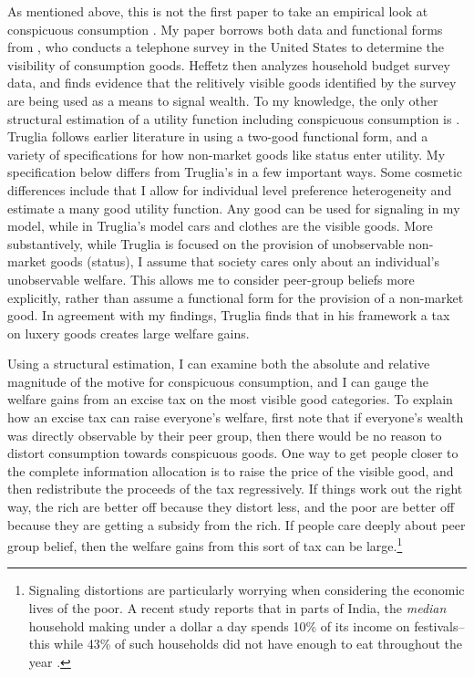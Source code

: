 \documentclass[12pt]{article}
\begin{document}
As mentioned above, this is not the first paper to take an empirical look at conspicuous consumption  \citep{Blochetal2004,Charlesetal2009,MoavNeeman2010,MoavNeeman2012}.  My paper borrows both data and functional forms from \citet{Heffetz2011}, who conducts a telephone survey in the United States to determine the visibility of consumption goods.  Heffetz then analyzes household budget survey data, and finds evidence that the relitively visible goods identified by the survey are being used as a means to signal wealth.  To my knowledge, the only other structural estimation of a utility function including conspicuous consumption is \citet{Truglia2012}.  Truglia follows earlier literature in using a two-good functional form, and a variety of specifications for how non-market goods like status enter utility.  My specification below differs from Truglia's in a few important ways.  Some cosmetic differences include that I allow for individual level preference heterogeneity and estimate a many good utility function.  Any good can be used for signaling in my model, while in Truglia's model cars and clothes are the visible goods.  More substantively, while Truglia is focused on the provision of unobservable non-market goods (status), I assume that society cares only about an individual's unobservable welfare.  This allows me to consider peer-group beliefs more explicitly, rather than assume a functional form for the provision of a non-market good.  In agreement with my findings, Truglia finds that in his framework a tax on luxery goods creates large welfare gains.

Using a structural estimation, I can examine both the absolute and relative magnitude of the motive for conspicuous consumption, and I can gauge the welfare gains from an excise tax on the most visible good categories.  To explain how an excise tax can raise everyone's welfare, first note that if everyone's wealth was directly observable by their peer group, then there would be no reason to distort consumption towards conspicuous goods.  One way to get people closer to the complete information allocation is to raise the price of the visible good, and then redistribute the proceeds of the tax regressively.  If things work out the right way, the rich are better off because they distort less, and the poor are better off because they are getting a subsidy from the rich.  If people care deeply about peer group belief, then the welfare gains from this sort of tax can be large.\footnote{Signaling distortions are particularly worrying when considering the economic lives of the poor.  A recent study reports that in parts of India, the \emph{median} household making under a dollar a day spends 10\% of its income on festivals--this while 43\% of such households did not have enough to eat throughout the year \citep{BanerjeeDuflo2007}.  } 
\end{document}
